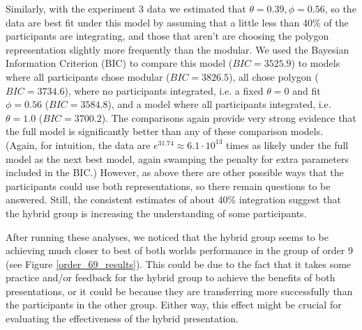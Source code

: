 \documentclass[man,10pt]{apa6}
\begin{document}
Similarly, with the experiment 3 data we estimated that $\theta = 0.39, \phi = 0.56$, so the data are best fit under this model by assuming that a little less than 40\% of the participants are integrating, and those that aren't are choosing the polygon representation slightly more frequently than the modular. We used the Bayesian Information Criterion (BIC) to compare this model ($BIC = 3525.9$) to models where all participants chose modular ($BIC=3826.5$), all chose polygon ($BIC = 3734.6$), where no participants integrated, i.e. a fixed $\theta = 0$ and fit $\phi = 0.56$ ($BIC = 3584.8$), and a model where all participants integrated, i.e. $\theta = 1.0$ ($BIC = 3700.2$). The comparisons again provide very strong evidence that the full model is significantly better than any of these comparison models. (Again, for intuition, the data are $e^{31.74} \approx 6.1 \cdot 10^{13}$ times as likely under the full model as the next best model, again swamping the penalty for extra parameters included in the BIC.) However, as above there are other possible ways that the participants could use both representations, so there remain questions to be answered. Still, the consistent estimates of about 40\% integration suggest that the hybrid group is increasing the understanding of some participants.\par
After running these analyses, we noticed that the hybrid group seems to be achieving much closer to best of both worlds performance in the group of order 9 (see Figure \ref{order_69_results}). This could be due to the fact that it takes some practice and/or feedback for the hybrid group to achieve the benefits of both presentations, or it could be because they are transferring more successfully than the participants in the other group. Either way, this effect might be crucial for evaluating the effectiveness of the hybrid presentation. \par
\end{document}
